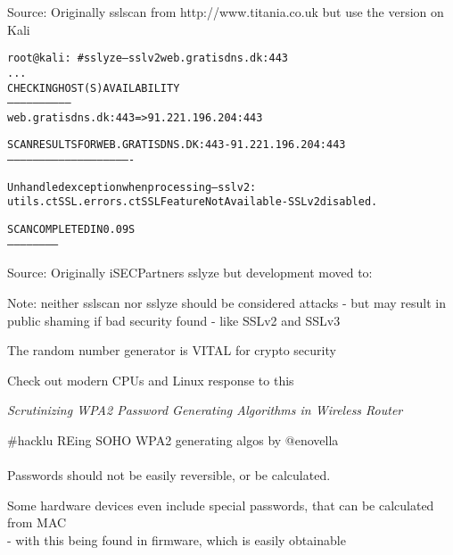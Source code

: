 \documentclass[20pt,landscape,a4paper,footrule]{foils}
\begin{document}
Source:
Originally sslscan from http://www.titania.co.uk
 but use the version on Kali



\begin{alltt}\small
root@kali:~# sslyze --sslv2 web.gratisdns.dk:443
...
 CHECKING HOST(S) AVAILABILITY
 -----------------------------
   web.gratisdns.dk:443                => 91.221.196.204:443

 SCAN RESULTS FOR WEB.GRATISDNS.DK:443 - 91.221.196.204:443
 ----------------------------------------------------------

Unhandled exception when processing --sslv2:
utils.ctSSL.errors.ctSSLFeatureNotAvailable - SSLv2 disabled.

 SCAN COMPLETED IN 0.09 S
 ------------------------
 \end{alltt}

Source:
Originally iSECPartners sslyze but development moved to:\\


Note: neither sslscan nor sslyze should be considered attacks - but may result in public shaming if bad security found - like SSLv2 and SSLv3



{\small{}}

\vskip 2cm
\centerline{The random number generator is VITAL for crypto security}

Check out modern CPUs and Linux response to this\\


\emph{Scrutinizing WPA2 Password Generating Algorithms in Wireless Router}

\#hacklu REing SOHO WPA2 generating algos by @enovella\\ \\

Passwords should not be easily reversible, or be calculated.

Some hardware devices even include special passwords, that can be calculated from MAC\\
- with this being found in firmware, which is easily obtainable
\end{document}
